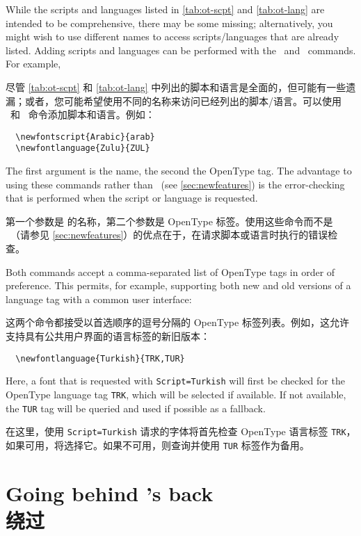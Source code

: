 \documentclass[a4paper]{l3doc}
\begin{document}
\DescribeMacro{\newfontscript}
\DescribeMacro{\newfontlanguage}
While the scripts and languages listed in \ref{tab:ot-scpt} and \ref{tab:ot-lang}
are intended to be comprehensive, there may be some missing; alternatively,
you might wish to use different names to access scripts/languages that are
already listed.
Adding scripts and languages can be performed with the \cmd\newfontscript\
and \cmd\newfontlanguage\ commands. For example,

尽管 \ref{tab:ot-scpt} 和 \ref{tab:ot-lang} 中列出的脚本和语言是全面的，但可能有一些遗漏；或者，您可能希望使用不同的名称来访问已经列出的脚本/语言。可以使用 \cmd\newfontscript\ 和 \cmd\newfontlanguage\ 命令添加脚本和语言。例如：
\begin{Verbatim}
  \newfontscript{Arabic}{arab}
  \newfontlanguage{Zulu}{ZUL}
\end{Verbatim}
The first argument is the  name, the second the OpenType
tag. The advantage to using these commands rather than \cmd\newfontfeature\
(see \vref{sec:newfeatures}) is the error-checking that is performed when
the script or language is requested.

第一个参数是  的名称，第二个参数是 OpenType 标签。使用这些命令而不是 \cmd\newfontfeature\ （请参见 \vref{sec:newfeatures}）的优点在于，在请求脚本或语言时执行的错误检查。

Both commands accept a comma-separated list of OpenType tags in order of preference.
This permits, for example, supporting both new and old versions of a language tag with
a common user interface:

这两个命令都接受以首选顺序的逗号分隔的 OpenType 标签列表。例如，这允许支持具有公共用户界面的语言标签的新旧版本：
\begin{Verbatim}
  \newfontlanguage{Turkish}{TRK,TUR}
\end{Verbatim}
Here, a font that is requested with \verb|Script=Turkish| will first be checked for the
OpenType language tag \verb|TRK|, which will be selected if available. If not available,
the \verb|TUR| tag will be queried and used if possible as a fallback.

在这里，使用 \verb|Script=Turkish| 请求的字体将首先检查 OpenType 语言标签 \verb|TRK|，如果可用，将选择它。如果不可用，则查询并使用 \verb|TUR| 标签作为备用。

\section{Going behind \pkg{fontspec}'s back\\绕过 \pkg{fontspec}}
\end{document}

